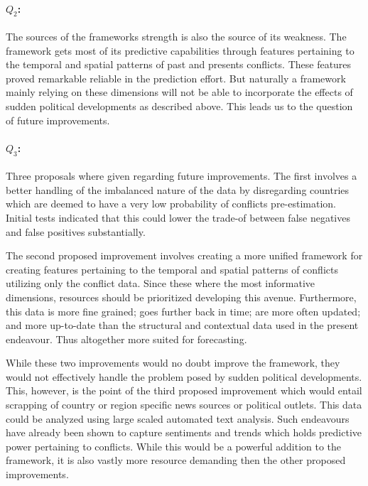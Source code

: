 \documentclass[a4paper]{article}
\begin{document}
\paragraph{$Q_2$:} The sources of the frameworks strength is also the source of its weakness. The framework gets most of its predictive capabilities through features pertaining to the temporal and spatial patterns of past and presents conflicts. These features proved remarkable reliable in the prediction effort. But naturally a framework mainly relying on these dimensions will not be able to incorporate the effects of sudden political developments as described above. This leads us to the question of future improvements.\par 

\paragraph{$Q_3$:} Three proposals where given regarding future improvements. The first involves a better handling of the imbalanced nature of the data by disregarding countries which are deemed to have a very low probability of conflicts pre-estimation. Initial tests indicated that this could lower the trade-of between false negatives and false positives substantially.\par

The second proposed improvement involves creating a more unified framework for creating features pertaining to the temporal and spatial patterns of conflicts utilizing only the conflict data. Since these where the most informative dimensions, resources should be prioritized developing this avenue. Furthermore, this data is more fine grained; goes further back in time; are more often updated; and more up-to-date than the structural and contextual data used in the present endeavour. Thus altogether more suited for forecasting.\par

While these two improvements would no doubt improve the framework, they would not effectively handle the problem posed by sudden political developments. This, however, is the point of the third proposed improvement which would entail scrapping of country or region specific news sources or political outlets. This data could be analyzed using large scaled automated text analysis. Such endeavours have already been shown to capture sentiments and trends which holds predictive power pertaining to conflicts. While this would be a powerful addition to the framework, it is also vastly more resource demanding then the other proposed improvements.\par
\end{document}
